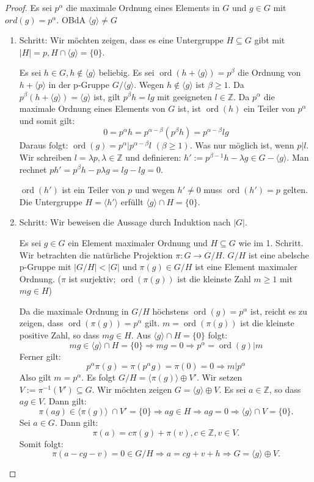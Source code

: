 \documentclass[12pt]{scrartcl} %
\DeclareMathOperator{\ord}{ord}
\theoremstyle{definition}
\theoremstyle{remark}
\begin{document}
\begin{proof}
Es sei $p^{\alpha}$ die maximale Ordnung eines Elements in $G$ und $g\in G$ mit $ord(g)=p^{\alpha}$. OBdA $\langle g\rangle \neq G$ 
\begin{enumerate}
\item Schritt: Wir möchten zeigen, dass es eine Untergruppe $H\subseteq G$ gibt mit $|H|=p, H\cap \langle g\rangle =\{ 0\}$.

Es sei $h \in G,h\notin \langle g \rangle$ beliebig.
Es sei $\ord(h+\langle g\rangle)=p^{\beta}$ die Ordnung von $h+\langle p\rangle$ in der p-Gruppe $G/\langle g\rangle$.
Wegen $h\notin \langle g\rangle$ ist $\beta\geq1$. 
Da $p^{\beta}(h+\langle g\rangle)=\langle g\rangle$ ist, gilt $p^{\beta}h=lg$ mit geeigneten $l\in \mathbb{Z}$. 
Da $p^{\alpha}$ die maximale Ordnung eines Elements von $G$ ist, ist $\ord(h)$ ein Teiler von $p^{\alpha}$ und somit gilt:
\[ 0=p^{\alpha}h=p^{\alpha -\beta}(p^{\beta}h)=p^{\alpha -\beta}lg\]
Daraus folgt: $ \ord(g)=p^{\alpha}|p^{\alpha -\beta}l$ $(\beta \geq 1)$. 
Was nur möglich ist, wenn $p|l$. 
Wir schreiben $l=\lambda p, \lambda \in \mathbb{Z}$ und definieren: $h':=p^{\beta -1}h-\lambda g \in G - \langle g \rangle.$ Man rechnet $ ph' = p^{\beta}h - p \lambda g =lg-lg=0$.

$\ord(h')$ ist ein Teiler von $p$ und wegen $h'\neq 0$ muss $\ord(h')=p$ gelten. 
Die Untergruppe $H=\langle h'\rangle$ erfüllt $\langle g\rangle \cap H=\{ 0\}$.
\item Schritt: Wir beweisen die Aussage durch Induktion nach $|G|$.

Es sei $g\in G$ ein Element maximaler Ordnung und $H\subseteq G$ wie im 1. Schritt. 
Wir betrachten die natürliche Projektion $\pi :G\rightarrow G/H$. 
$G/H$ ist eine abelsche p-Gruppe mit $|G/H|<|G|$ und $\pi (g)\in G/H$ ist eine Element maximaler Ordnung.
($\pi$ ist surjektiv; $\ord(\pi (g))$ ist die kleinste Zahl $m\geq 1$ mit $mg\in H$)

Da die maximale Ordnung in $G/H$ höchstens $\ord(g)=p^{\alpha}$ ist, reicht es zu zeigen, dass $\ord(\pi (g))=p^{\alpha}$ gilt.
$m=\ord(\pi (g))$ ist die kleinste positive Zahl, so dass $mg\in H$. Aus $\langle g\rangle \cap H=\{ 0\}$ folgt:
\[ mg\in \langle g\rangle \cap H=\{ 0\} \Rightarrow mg=0 \Rightarrow p^{\alpha}=\ord(g)|m\]
Ferner gilt:
\[ p^{\alpha}\pi (g)=\pi (p^{\alpha}g)=\pi(0) =0\Rightarrow m|p^{\alpha}\]
Also gilt $m=p^{\alpha}$. Es folgt $G/H=\langle \pi (g)\rangle \oplus V'$. 
Wir setzen $V := \pi ^{-1}(V') \subseteq G$. Wir möchten zeigen $G=\langle g\rangle \oplus V$. Es sei $a\in \mathbb{Z}$, so dass $ag\in V$. Dann gilt:
\[ \pi (ag)\in \langle \pi (g)\rangle\ \cap V'=\{ 0\}\Rightarrow ag\in H\Rightarrow ag=0\Rightarrow \langle g\rangle \cap V=\{ 0\}.\]
Sei $a\in G$. Dann gilt:
\[ \pi (a)=c\pi (g)+\pi (v),c\in \mathbb{Z}, v\in V.\]
Somit folgt:
\[ \pi (a-cg-v )=0\in G/H\Rightarrow a=cg+v+h\Rightarrow G = \langle g\rangle \oplus V.\]
\qedhere
\end{enumerate} 
\end{proof}
\end{document}
